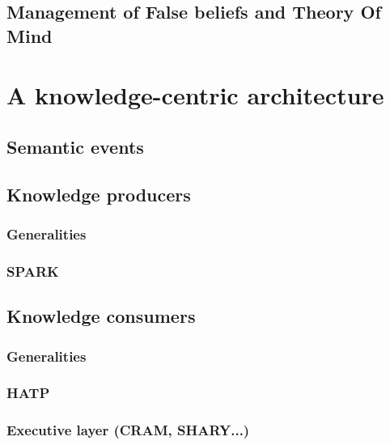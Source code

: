 \subsection{Management of False beliefs and Theory Of Mind}
\label{sect|theory-of-mind}


\section{A knowledge-centric architecture}
\label{sect|knowledge-centric-architecture}

\subsection{Semantic events}
\label{sect|semantic-events}

\subsection{Knowledge producers}
\label{sect|producers}

\subsubsection{Generalities}
\label{subssect|producers-generalities}

\subsubsection{SPARK}
\label{subssect|spark}

\subsection{Knowledge consumers}
\label{sect|consumers}

\subsubsection{Generalities}
\label{subssect|consumers-generalities}

\subsubsection{HATP}
\label{subssect|hatp}

\subsubsection{Executive layer (CRAM, SHARY...)}
\label{subssect|supervision}
